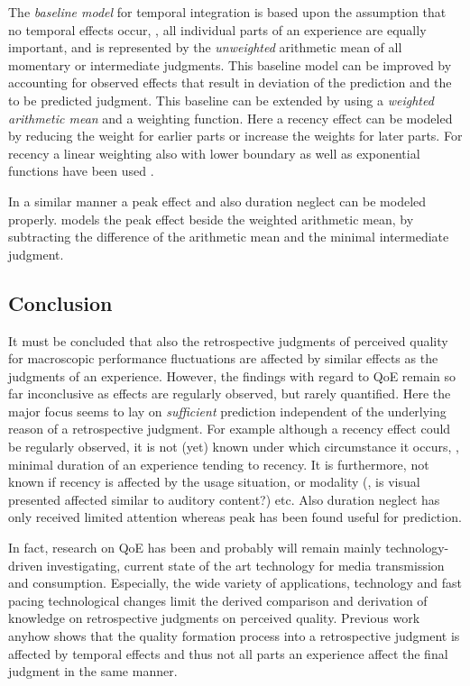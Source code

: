 The \emph{baseline model} for temporal integration is based upon the assumption that no temporal effects occur, \ie, all individual parts of an experience are equally important, and is represented by the \emph{unweighted} arithmetic mean of all momentary or intermediate judgments.
This baseline model can be improved by accounting for observed effects that result in deviation of the prediction and the to be predicted judgment.
This baseline can be extended by using a \emph{weighted arithmetic mean} and a weighting function.
Here a recency effect can be modeled by reducing the weight for earlier parts \citep[\cf,][]{rosenbluth_testing_1998, weiss_modeling_2009, hamberg_time-varying_1999} or increase the weights for later parts.
For recency a linear weighting also with lower boundary \citep[\eg,][]{weiss_modeling_2009} as well as exponential functions have been used \cite[\eg,][]{hamberg_time-varying_1999}.

In a similar manner a peak effect and also duration neglect can be modeled properly.
\cite{weiss_modeling_2009} models the peak effect beside the weighted arithmetic mean, by subtracting the difference of the arithmetic mean and the minimal intermediate judgment.


\subsection{Conclusion}
It must be concluded that also the retrospective judgments of perceived quality for macroscopic performance fluctuations are affected by similar effects as the judgments of an experience.
However, the findings with regard to \ac{QoE} remain so far inconclusive as effects are regularly observed, but rarely quantified.
Here the major focus seems to lay on \emph{sufficient} prediction independent of the underlying reason of a retrospective judgment.
For example although a recency effect could be regularly observed, it is not (yet) known under which circumstance it occurs, \eg, minimal duration of an experience tending to recency.
It is furthermore, not known if recency is affected by the usage situation, or modality (\eg, is visual presented affected similar to auditory content?) etc.
Also duration neglect has only received limited attention whereas peak has been found useful for prediction.

In fact, research on \ac{QoE} has been and probably will remain mainly technology-driven investigating, current state of the art technology for media transmission and consumption.
Especially, the wide variety of applications, technology and fast pacing technological changes limit the derived comparison and derivation of knowledge on retrospective judgments on perceived quality.
Previous work anyhow shows that the quality formation process into a retrospective judgment is affected by temporal effects and thus not all parts an experience affect the final judgment in the same manner.